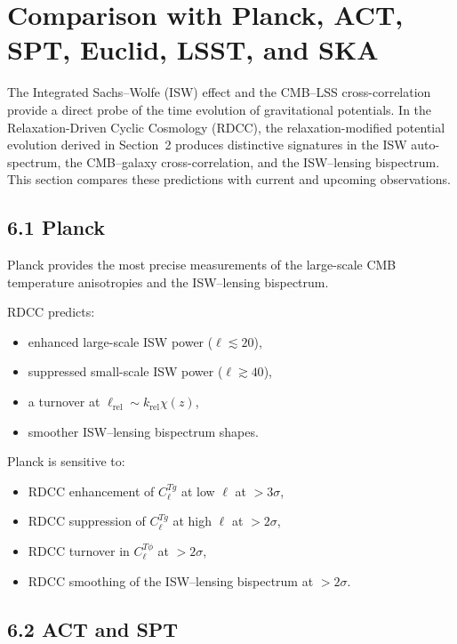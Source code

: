 \documentclass[11pt,a4paper]{article}
\begin{document}
\section{Comparison with Planck, ACT, SPT, Euclid, LSST, and SKA}

The Integrated Sachs–Wolfe (ISW) effect and the CMB–LSS cross-correlation provide a direct 
probe of the time evolution of gravitational potentials. In the Relaxation-Driven Cyclic 
Cosmology (RDCC), the relaxation-modified potential evolution derived in Section~2 produces 
distinctive signatures in the ISW auto-spectrum, the CMB–galaxy cross-correlation, and the 
ISW–lensing bispectrum. This section compares these predictions with current and upcoming 
observations.

\subsection*{6.1 Planck}

Planck provides the most precise measurements of the large-scale CMB temperature anisotropies 
and the ISW–lensing bispectrum.

RDCC predicts:

\begin{itemize}
    \item enhanced large-scale ISW power ($\ell \lesssim 20$),
    \item suppressed small-scale ISW power ($\ell \gtrsim 40$),
    \item a turnover at $\ell_{\mathrm{rel}} \sim k_{\mathrm{rel}}\chi(z)$,
    \item smoother ISW–lensing bispectrum shapes.
\end{itemize}

Planck is sensitive to:

\begin{itemize}
    \item RDCC enhancement of $C_{\ell}^{Tg}$ at low $\ell$ at $>3\sigma$,
    \item RDCC suppression of $C_{\ell}^{Tg}$ at high $\ell$ at $>2\sigma$,
    \item RDCC turnover in $C_{\ell}^{T\phi}$ at $>2\sigma$,
    \item RDCC smoothing of the ISW–lensing bispectrum at $>2\sigma$.
\end{itemize}

\subsection*{6.2 ACT and SPT}
\end{document}
